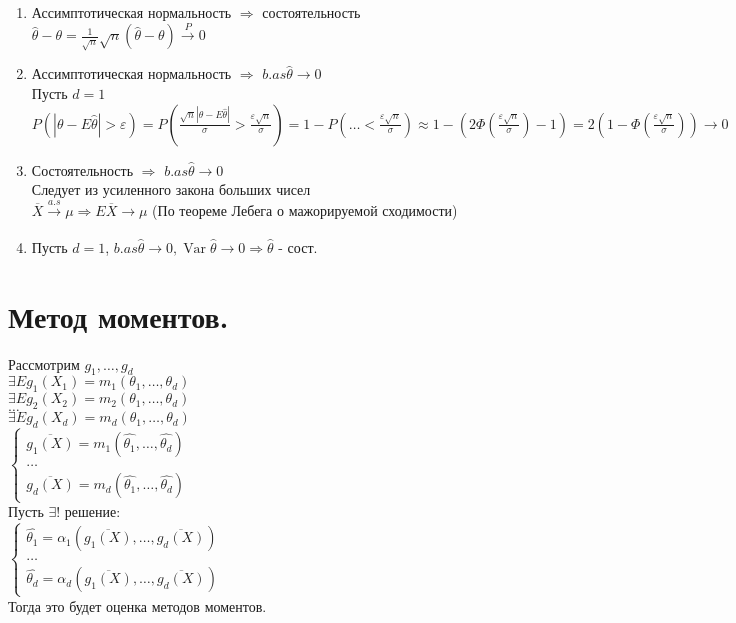 \documentclass{article}
\newcommand\0{\mathbb{0}}
\DeclareMathOperator{\Var}{Var}
\newcommand\1{\mathbb{1}}
\begin{document}
\begin{enumerate}
    \item Ассимптотическая нормальность $\Rightarrow$ состоятельность\\
    $\widehat{\theta} - \theta = \frac{1}{\sqrt{n}}\sqrt{n}(\widehat{\theta} - \theta) \xrightarrow[]{P} 0$\\
    \item Ассимптотическая нормальность $\Rightarrow$ $b.as \widehat{\theta} \to 0$\\
    Пусть $d = 1$\\
    $P(|\theta - E\widehat{\theta}| > \varepsilon) = P(\frac{\sqrt{n}|\theta - E\widehat{\theta}|}{\sigma} > \frac{\varepsilon \sqrt{n}}{\sigma}) = 1 - P(\dots < \frac{\varepsilon \sqrt{n}}{\sigma}) \approx 1 - (2\Phi(\frac{\varepsilon \sqrt{n}}{\sigma}) - 1) = 2(1 - \Phi(\frac{\varepsilon \sqrt{n}}{\sigma})) \to 0$
    \item Состоятельность $\Rightarrow$ $b.as \widehat{\theta} \to 0$\\
    Следует из усиленного закона больших чисел\\
    $\overline{X} \xrightarrow[]{a.s} \mu \Rightarrow E\overline{X} \to \mu$ (По теореме Лебега о мажорируемой сходимости)
    \item Пусть $d = 1$, $b.as \widehat{\theta} \to 0, \Var\widehat{\theta} \to 0 \Rightarrow \widehat{\theta}$ - сост.
\end{enumerate}
\section{Метод моментов.}
Рассмотрим $g_1, \dots, g_d$\\
$\exists Eg_1(X_1) = m_1(\theta_1, \dots, \theta_d)$\\
$\exists Eg_2(X_2) = m_2(\theta_1, \dots, \theta_d)$\\
$\dots$\\
$\exists Eg_d(X_d) = m_d(\theta_1, \dots, \theta_d)$\\
$\begin{cases}
\overline{g_1(X)} = m_1(\widehat{\theta_1}, \dots, \widehat{\theta_d})\\
\dots\\
\overline{g_d(X)} = m_d(\widehat{\theta_1}, \dots, \widehat{\theta_d})
\end{cases}$\\
Пусть $\exists!$ решение:\\
$\begin{cases}
\widehat{\theta_1} = \alpha_1(\overline{g_1(X)}, \dots, \overline{g_d(X)})\\
\dots\\
\widehat{\theta_d} = \alpha_d(\overline{g_1(X)}, \dots, \overline{g_d(X)})
\end{cases}$\\
Тогда это будет оценка методов моментов.\\
\end{document}
